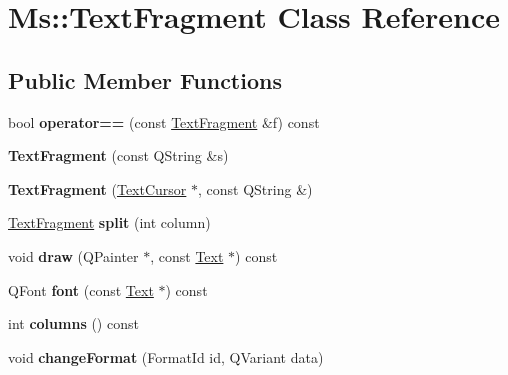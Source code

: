 \hypertarget{class_ms_1_1_text_fragment}{}\section{Ms\+:\+:Text\+Fragment Class Reference}
\label{class_ms_1_1_text_fragment}
\subsection*{Public Member Functions}
\begin{DoxyCompactItemize}
\item 
\mbox{\label{class_ms_1_1_text_fragment_a066f356124de2a4df0c8f765c2d7e869}} 
bool {\bfseries operator==} (const \hyperlink{class_ms_1_1_text_fragment}{Text\+Fragment} \&f) const
\item 
\mbox{\label{class_ms_1_1_text_fragment_a785f0417b97931847a505375527aace8}} 
{\bfseries Text\+Fragment} (const Q\+String \&s)
\item 
\mbox{\label{class_ms_1_1_text_fragment_ab5e01c6d3d7a83ffad7c18a6ccfe19fc}} 
{\bfseries Text\+Fragment} (\hyperlink{class_ms_1_1_text_cursor}{Text\+Cursor} $\ast$, const Q\+String \&)
\item 
\mbox{\label{class_ms_1_1_text_fragment_aca1fbf287e3ea892b09bbefc26876880}} 
\hyperlink{class_ms_1_1_text_fragment}{Text\+Fragment} {\bfseries split} (int column)
\item 
\mbox{\label{class_ms_1_1_text_fragment_adb8deed70750f866f9db3fa58ce8bdd3}} 
void {\bfseries draw} (Q\+Painter $\ast$, const \hyperlink{class_ms_1_1_text}{Text} $\ast$) const
\item 
\mbox{\label{class_ms_1_1_text_fragment_a75856f7742bc4740f1c23758dbb5eede}} 
Q\+Font {\bfseries font} (const \hyperlink{class_ms_1_1_text}{Text} $\ast$) const
\item 
\mbox{\label{class_ms_1_1_text_fragment_abd492edb356ec776e81fd6db0bdf9329}} 
int {\bfseries columns} () const
\item 
\mbox{\label{class_ms_1_1_text_fragment_a4412cd3e729a247963e8660d340de0e4}} 
void {\bfseries change\+Format} (Format\+Id id, Q\+Variant data)
\end{DoxyCompactItemize}
